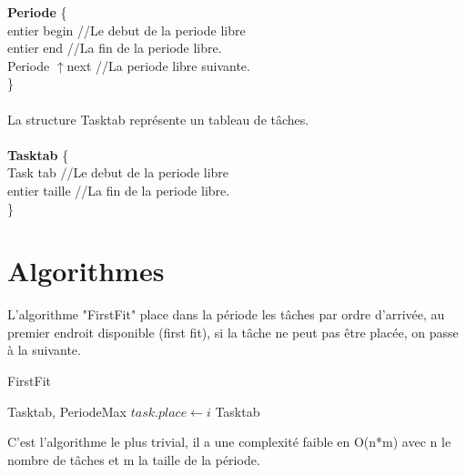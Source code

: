 \documentclass[11pt]{article}
\begin{document}
\indent \textbf{Periode} \{ \\
    \indent \indent entier begin    \indent \indent//Le debut de la periode libre\\
    \indent \indent entier end \indent \indent //La fin de la periode libre.\\
    \indent \indent Periode $\uparrow$next \indent //La periode libre suivante.\\
\indent\}
\\\\
La structure Tasktab représente un tableau de tâches.\\\\
\indent \textbf{Tasktab} \{ \\
    \indent \indent Task tab    \indent \indent//Le debut de la periode libre\\
    \indent \indent entier taille \indent   //La fin de la periode libre.\\
\indent\}

\section{Algorithmes}

L'algorithme "FirstFit" place dans la période les tâches par ordre d'arrivée, au premier endroit disponible (first fit), si la tâche ne peut pas être placée, on passe à la suivante.
\begin{algorithm}
    \caption{FirstFit}
    \begin{algorithmic}
    \REQUIRE Tasktab, PeriodeMax
            \STATE $task.place \leftarrow i$
         \ENDIF
        \ENDFOR
    \ENDFOR
    \RETURN Tasktab
    \end{algorithmic}
\end{algorithm}

C'est l'algorithme le plus trivial, il a une complexité faible en O(n*m) avec n le nombre de tâches et m la taille de la période.\\
\end{document}
